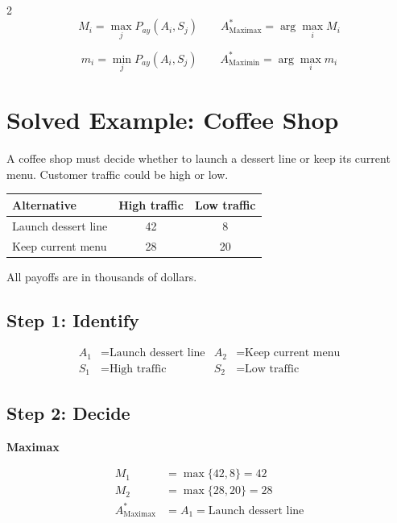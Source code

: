 \begin{multicols}{2}
		\[
		\boxed{
			M_i=\max_j P_{ay}(A_i,S_j)
			\qquad
			A^*_{\mathrm{Maximax}}=\arg\max_i M_i
		}
		\]
		
		\[
		\boxed{
			m_i=\min_j P_{ay}(A_i,S_j)
			\qquad
			A^*_{\mathrm{Maximin}}=\arg\max_i m_i
		}
		\]
		
		
		\section{Solved Example: Coffee Shop}
		A coffee shop must decide whether to launch a dessert line or keep its
		current menu. Customer traffic could be high or low.
		\begin{center}
			\renewcommand{\arraystretch}{1.3}
			\small
			\begin{tabular}{lcc}
				\toprule
				Alternative & High traffic & Low traffic \\
				\midrule
				Launch dessert line  & 42 & 8 \\
				Keep current menu & 28 & 20 \\
				\bottomrule
			\end{tabular}
		\end{center}
		All payoffs are in thousands of dollars.
		\subsection*{Step 1: Identify}
		\[
		\begin{array}{llll}
			A_1 &= \textrm{Launch dessert line} &
			A_2 &= \textrm{Keep current menu} \\[3pt]
			S_1 &= \textrm{High traffic} &
			S_2 &= \textrm{Low traffic}
		\end{array}
		\]
		
		\subsection*{Step 2: Decide}
		
		\textbf{Maximax}
		
		\[
		\begin{array}{ll}
			M_1 &= \max\{42,8\}=42 \\
			M_2 &= \max\{28,20\}=28 \\
			A^*_{\mathrm{Maximax}} &= A_1 = \textrm{Launch dessert line}
		\end{array}
		\]
		

\end{multicols}

